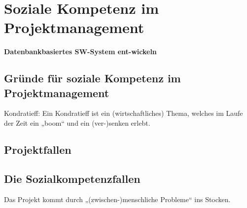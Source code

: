 \newcommand{\customDir}{../}








%



\maketitle
\newpage
\tableofcontents
\newpage

\chapter{Soziale Kompetenz im Projektmanagement}
\subsubsection*{Datenbankbasiertes SW-System ent-wickeln}
\section{Gründe für soziale Kompetenz im Projektmanagement}
Kondratieff: Ein Kondratieff ist ein (wirtschaftliches) Thema, welches im Laufe der Zeit ein „boom“ und ein (ver-)senken erlebt.

\section{Projektfallen}

\section{Die Sozialkompetenzfallen}
Das Projekt kommt durch „(zwischen-)menschliche Probleme“ ins Stocken.
